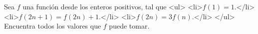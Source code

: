 Sea $f$ una función desde los enteros positivos, tal que 
<ul>
<li>$f(1)=1$.</li>
<li>$f(2n+1)=f(2n)+1$.</li>
<li>$f(2n)=3f(n)$.</li>
</ul>
Encuentra todos los valores que $f$ puede tomar.